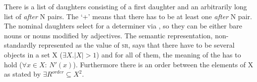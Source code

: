 \documentclass[output=paper,biblatex,babelshorthands,newtxmath,draftmode,colorlinks,citecolor=brown]{langscibook}
\begin{document}
\z
There is a list of daughters consisting of a first daughter and an arbitrarily long list of
\emph{after} N pairs. The `+'\is{+} means that there has to be at least one \emph{after} N pair. The
nominal daughters select for a determiner via \spr, so they can be either bare nouns or nouns
modified by adjectives. The semantic representation, non-standardly represented as the value of
\textsc{sr}, says that there have to be several objects in a set X ($\exists X.|X| >1$) and for all of them, the meaning
of the \nbar has to hold ($\forall x \in X{:\,}N'(x)$). Furthermore there is an order between the elements of X as stated by $\exists R^{order} \subseteq X^{2}$.


\end{document}
